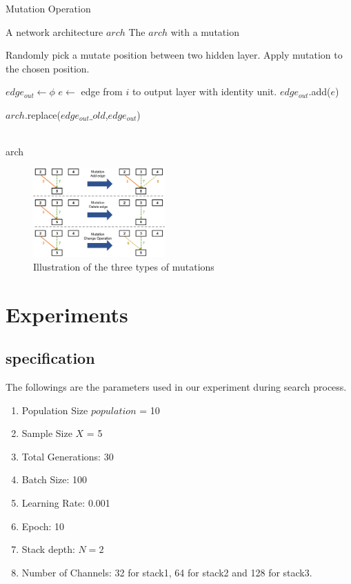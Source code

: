 \documentclass[conference]{IEEEtran}
\begin{document}
 \begin{algorithm}[H]  
	\caption{ Mutation Operation}
 

	\begin{algorithmic}[1]  
	\Require A network architecture $arch$
	\Ensure The $arch$ with a mutation
	
	
		\State Randomly pick a mutate position between two hidden layer.
		\State Apply mutation to the chosen position. 
    \EndWhile
    
    \State $edge_{out} \gets \phi$
      \State $e \gets$ edge from $i$ to output layer with identity unit.
      \State $edge_{out}$.add($e$)
    \EndFor

    \State $arch$.replace($edge_{out}\_old$,$edge_{out}$)

    \\
    \Return arch
	\end{algorithmic}  
\end{algorithm}  

\begin{figure}[H]
	\centering
	\includegraphics[width=0.45\textwidth]{figures/mutation.png}
	\caption{Illustration of the three types of mutations}\label{fig:digit}
	\label{mutation}
\end{figure}


 \section{Experiments}

 \subsection{specification}
 The followings are the parameters used in our experiment during search process.
 \begin{enumerate}
  \item Population Size $population$ = 10
  \item Sample Size $X$ = 5
  \item Total Generations: 30
  \item Batch Size: 100
  \item Learning Rate: 0.001
  \item Epoch: 10
  \item Stack depth: $N = 2$
  \item Number of Channels: 32 for stack1, 64 for stack2 and 128 for stack3.
 \end{enumerate}
\end{document}
